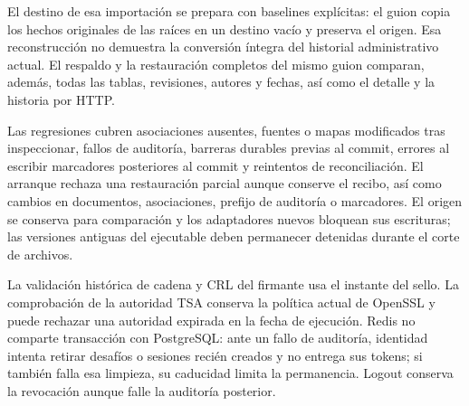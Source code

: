 El destino de esa importación se prepara con baselines explícitas: el guion copia los hechos originales de las raíces en un destino vacío y preserva el origen. Esa reconstrucción no demuestra la conversión íntegra del historial administrativo actual. El respaldo y la restauración completos del mismo guion comparan, además, todas las tablas, revisiones, autores y fechas, así como el detalle y la historia por HTTP.

Las regresiones cubren asociaciones ausentes, fuentes o mapas modificados tras inspeccionar, fallos de auditoría, barreras durables previas al commit, errores al escribir marcadores posteriores al commit y reintentos de reconciliación. El arranque rechaza una restauración parcial aunque conserve el recibo, así como cambios en documentos, asociaciones, prefijo de auditoría o marcadores. El origen se conserva para comparación y los adaptadores nuevos bloquean sus escrituras; las versiones antiguas del ejecutable deben permanecer detenidas durante el corte de archivos.

La validación histórica de cadena y CRL del firmante usa el instante del sello. La comprobación de la autoridad TSA conserva la política actual de OpenSSL y puede rechazar una autoridad expirada en la fecha de ejecución. Redis no comparte transacción con PostgreSQL: ante un fallo de auditoría, identidad intenta retirar desafíos o sesiones recién creados y no entrega sus tokens; si también falla esa limpieza, su caducidad limita la permanencia. Logout conserva la revocación aunque falle la auditoría posterior.
